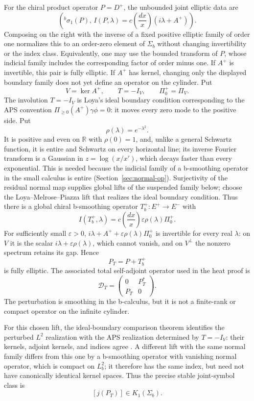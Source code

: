 \documentclass[12pt,oneside,reqno]{article}
\theoremstyle{plain}
\theoremstyle{definition}
\theoremstyle{remark}
\begin{document}
For the chiral product operator \(P=D^+\), the unbounded joint elliptic
data are
\[
 \left({}^b\sigma_1(P),\,
 I(P,\lambda)=
 c\!\left(\frac{dx}{x}\right)(i\lambda+A^+)\right).
\]
Composing on the right with the inverse of a fixed positive elliptic
family of order one normalizes this to an order-zero element of
\(\Sigma_b\) without changing invertibility or the index class.
Equivalently, one may use the bounded transform of \(P\), whose indicial
family includes the corresponding factor of order minus one.
If \(A^+\) is invertible, this pair is fully elliptic. If \(A^+\) has kernel,
changing only the displayed boundary family does not yet define an
operator on the cylinder. Put
\[
 V=\ker A^+,
 \qquad T=-I_V,
 \qquad \Pi_0^+=\Pi_V.
\]
The involution \(T=-I_V\) is Loya's ideal boundary condition corresponding
to the APS convention \(\Pi_{\geq0}(A^+)\gamma\phi=0\): it moves every zero
mode to the positive side. Put
\[
 \rho(\lambda)=e^{-\lambda^2}.
\]
It is positive and even on \(\mathbb R\) with \(\rho(0)=1\), and, unlike
a general Schwartz function, it is entire and Schwartz on every horizontal
line; its inverse Fourier transform is a Gaussian in \(z=\log(x/x')\), which
decays faster than every exponential. This is needed because the
indicial family of a b-smoothing operator in the small calculus is entire
(Section~\ref{sec:normal-op}). Surjectivity of the residual normal map
supplies global lifts of the suspended family below; choose the
Loya--Melrose--Piazza lift that realizes the ideal boundary condition.
Thus there is a global chiral b-smoothing operator
\(T_b^+:E^+\to E^-\)
with
\[
 I(T_b^+,\lambda)
 =c\!\left(\frac{dx}{x}\right)
   \varepsilon\rho(\lambda)\Pi_0^+.
\]
For sufficiently small \(\varepsilon>0\),
\(i\lambda+A^++\varepsilon\rho(\lambda)\Pi_0^+\) is invertible for every
real \(\lambda\): on \(V\) it is the scalar
\(i\lambda+\varepsilon\rho(\lambda)\), which cannot vanish, and on
\(V^\perp\) the nonzero spectrum retains its gap. Hence
\[
 P_T=P+T_b^+
\]
is fully elliptic. The associated total self-adjoint operator used in the
heat proof is
\[
 \mathcal D_T=
 \begin{pmatrix}0&P_T^*\\P_T&0\end{pmatrix}.
\]
The perturbation is smoothing in the b-calculus, but it is not a
finite-rank or compact operator on the infinite cylinder.

For this chosen lift, the ideal-boundary comparison theorem identifies the
perturbed \(L^2\) realization with the APS realization determined by
\(T=-I_V\): their kernels, adjoint kernels, and indices agree
\cite{Loya,MelrosePiazza}. A different lift with the same normal family
differs from this one by a b-smoothing operator with vanishing normal
operator, which is compact on \(L_b^2\); it therefore has the same index,
but need not have canonically identical kernel spaces.
Thus the precise stable joint-symbol class is
\[
 [j(P_T)]\in K_1(\Sigma_b).
\]
\end{document}
